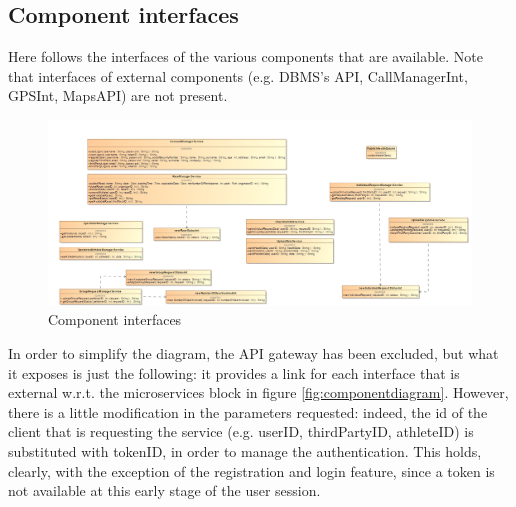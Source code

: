 \subsection{Component interfaces}
Here follows the interfaces of the various components that are available. 
Note that interfaces of external components (e.g. DBMS's API, CallManagerInt, GPSInt, MapsAPI) are not present. 

\begin{figure}[H]
\includegraphics[width=\linewidth]{Images/componentinterfaces.png}
\caption{ Component interfaces }
\label{fig:componentinterface}
\end{figure}

In order to simplify the diagram, the API gateway has been excluded, but what it exposes is just the following: it provides a link for each
interface that is external w.r.t. the microservices block in figure \ref{fig:componentdiagram}. However, there is a little modification in the
parameters requested: indeed, the id of the client that is requesting the service (e.g. userID, thirdPartyID, athleteID) is substituted with
tokenID, in order to manage the authentication. This holds, clearly, with the exception of the registration and login feature, since a token 
is not available at this early stage of the user session.